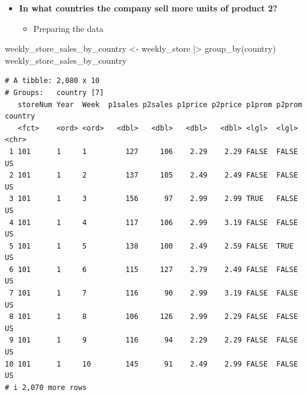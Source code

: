 \documentclass[
  ignorenonframetext,
]{beamer}
\newenvironment{Shaded}{\begin{snugshade}}{\end{snugshade}}
\newcommand{\FunctionTok}[1]{\textcolor[rgb]{0.28,0.35,0.67}{#1}}
\newcommand{\NormalTok}[1]{\textcolor[rgb]{0.00,0.23,0.31}{#1}}
\newcommand{\OtherTok}[1]{\textcolor[rgb]{0.00,0.23,0.31}{#1}}
\newcommand{\SpecialCharTok}[1]{\textcolor[rgb]{0.37,0.37,0.37}{#1}}
\providecommand{\tightlist}{%
  \setlength{\itemsep}{0pt}\setlength{\parskip}{0pt}}\usepackage{longtable,booktabs,array}
\begin{document}
\begin{frame}[fragile]{}
\label{section-28}
\begin{itemize}
\item
  \textbf{In what countries the company sell more units of product 2?}

  \begin{itemize}
  \tightlist
  \item
    Preparing the data
  \end{itemize}
\end{itemize}

\tiny

\begin{Shaded}
\begin{Highlighting}[]
\NormalTok{weekly\_store\_sales\_by\_country }\OtherTok{\textless{}{-}}\NormalTok{ weekly\_store }\SpecialCharTok{|\textgreater{}} 
  \FunctionTok{group\_by}\NormalTok{(country)}
\NormalTok{weekly\_store\_sales\_by\_country}
\end{Highlighting}
\end{Shaded}

\begin{verbatim}
# A tibble: 2,080 x 10
# Groups:   country [7]
   storeNum Year  Week  p1sales p2sales p1price p2price p1prom p2prom country
   <fct>    <ord> <ord>   <dbl>   <dbl>   <dbl>   <dbl> <lgl>  <lgl>  <chr>  
 1 101      1     1         127     106    2.29    2.29 FALSE  FALSE  US     
 2 101      1     2         137     105    2.49    2.49 FALSE  FALSE  US     
 3 101      1     3         156      97    2.99    2.99 TRUE   FALSE  US     
 4 101      1     4         117     106    2.99    3.19 FALSE  FALSE  US     
 5 101      1     5         138     100    2.49    2.59 FALSE  TRUE   US     
 6 101      1     6         115     127    2.79    2.49 FALSE  FALSE  US     
 7 101      1     7         116      90    2.99    3.19 FALSE  FALSE  US     
 8 101      1     8         106     126    2.99    2.29 FALSE  FALSE  US     
 9 101      1     9         116      94    2.29    2.29 FALSE  FALSE  US     
10 101      1     10        145      91    2.49    2.99 FALSE  FALSE  US     
# i 2,070 more rows
\end{verbatim}
\end{frame}
\end{document}
